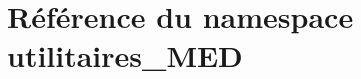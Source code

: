 \hypertarget{namespaceutilitaires__MED}{
\section{R\'{e}f\'{e}rence du namespace utilitaires\_\-MED}
\label{namespaceutilitaires__MED}
}


